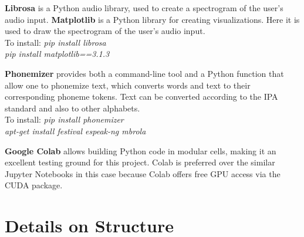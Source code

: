 \documentclass[12pt, letterpaper]{article}
\begin{document}
\textbf{Librosa} is a Python audio library, used to create a spectrogram of the user's audio input. 
\textbf{Matplotlib} is a Python library for creating visualizations. Here it is used to draw the spectrogram of the user's audio input.
\\To install: \textit{pip install librosa}
\\\hspace*{19mm} \textit{pip install matplotlib==3.1.3}

\textbf{Phonemizer} provides both a command-line tool and a Python function that allow one to phonemize text, which converts words and text to their corresponding phoneme tokens. Text can be converted according to the IPA standard and also to other alphabets.
\\To install: \textit{pip install phonemizer}
\\\hspace*{19mm} \textit{apt-get install festival espeak-ng mbrola}

\textbf{Google Colab} allows building Python code in modular cells, making it an excellent testing ground for this project. Colab is preferred over the similar Jupyter Notebooks in this case because Colab offers free GPU access via the CUDA package.
\newpage%


\section*{Details on Structure} \label{structure}
\end{document}
